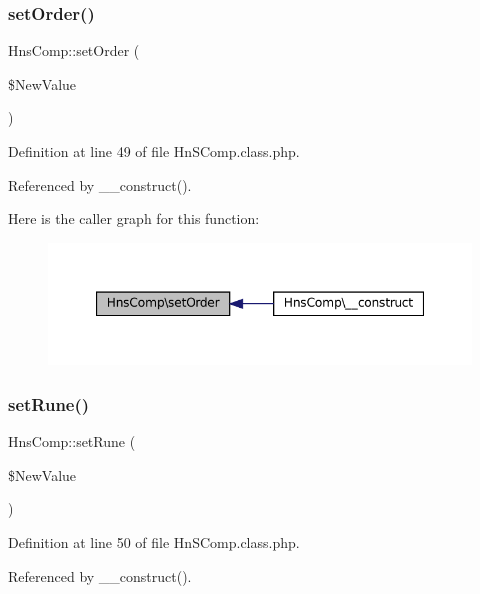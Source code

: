 \subsubsection{\texorpdfstring{set\+Order()}{setOrder()}}
{\footnotesize\ttfamily Hns\+Comp\+::set\+Order (\begin{DoxyParamCaption}\item[{}]{\$\+New\+Value }\end{DoxyParamCaption})}



Definition at line 49 of file Hn\+S\+Comp.\+class.\+php.



Referenced by \+\_\+\+\_\+construct().

Here is the caller graph for this function\+:\nopagebreak
\begin{figure}[H]
\begin{center}
\leavevmode
\includegraphics[width=347pt]{class_hns_comp_a501b33cbe91e2976f5489779d89ebebd_icgraph}
\end{center}
\end{figure}
\mbox{\label{class_hns_comp_ae086dd8569732b25182a768ebdfef669}} 
\subsubsection{\texorpdfstring{set\+Rune()}{setRune()}}
{\footnotesize\ttfamily Hns\+Comp\+::set\+Rune (\begin{DoxyParamCaption}\item[{}]{\$\+New\+Value }\end{DoxyParamCaption})}



Definition at line 50 of file Hn\+S\+Comp.\+class.\+php.



Referenced by \+\_\+\+\_\+construct().

